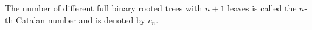 

\setcounter{section}{4}
\setcounter{subsection}{1}
\setcounter{dfn}{0}

\begin{dfn}
The number of different full binary rooted trees with $n+1$ leaves is called the $n$-th Catalan number and is denoted by $c_n$.
\end{dfn}



